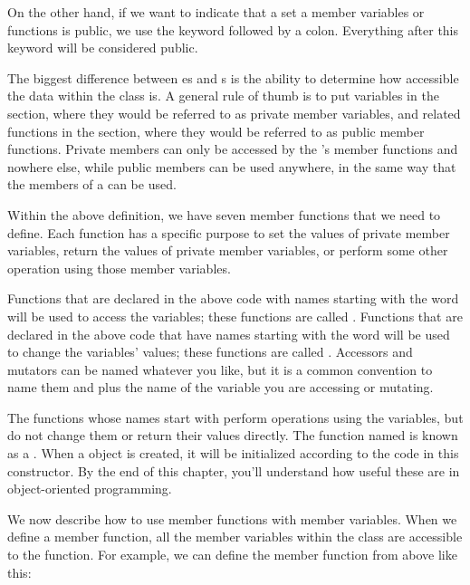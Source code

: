 On the other hand, if we want to indicate that a set a member variables or functions is public, we use the keyword  followed by a colon. 
Everything after this keyword will be considered public. 


The biggest difference between es and s is the ability to determine how accessible the data within the class is. 
A general rule of thumb is to put variables in the  section, where they would be referred to as private member variables, and related functions in the  section, where they would be referred to as public member functions. 
Private members can only be accessed by the 's member functions and nowhere else, while public members can be used anywhere, in the same way that the members of a  can be used.

Within the above  definition, we have seven member functions that we need to define. 
Each function has a specific purpose to set the values of private member variables, return the values of private member variables, or perform some other operation using those member variables.

Functions that are declared in the above code with names starting with the word  will be used to access the variables; these functions are called . 
Functions that are declared in the above code that have names starting with the word  will be used to change the variables' values; these functions are called . 
Accessors and mutators can be named whatever you like, but it is a common convention to name them  and  plus the name of the variable you are accessing or mutating. 

The functions whose names start with  perform operations using the variables, but do not change them or return their values directly.
The function named  is known as a . 
When a  object is created, it will be initialized according to the code in this constructor. 
By the end of this chapter, you'll understand how useful these are in object-oriented programming.
	

We now describe how to use member functions with  member variables. 
When we define a member function, all the member variables within the class are accessible to the function. 
For example, we can define the member function  from  above like this:

